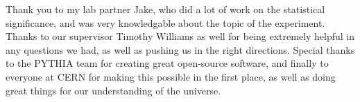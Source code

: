\documentclass[11pt]{amsart}
\begin{document}
\begin{multicols}{2}
Thank you to my lab partner Jake, who did a lot of work on the statistical significance, and was very knowledgable about the topic of the experiment. Thanks to our supervisor Timothy Williams as well for being extremely helpful in any questions we had, as well as pushing us in the right directions. Special thanks to the PYTHIA team for creating great open-source software, and finally to everyone at CERN for making this possible in the first place, as well as doing great things for our understanding of the universe.


\end{multicols}



\end{document}
